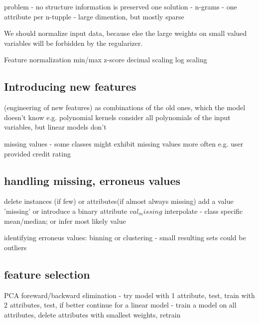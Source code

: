 \documentclass{article}
\begin{document}

problem - no structure information is preserved
          one solution - n-grams
              - one attribute per n-tupple
              - large dimention, but mostly sparse

We should normalize input data, because else the large weights on small valued variables will be forbidden by the regularizer.

Feature normalization
    min/max
    z-score
    decimal scaling
    log scaling

\subsection{Introducing new features}(engineering of new features) as combinations of the old ones, which the model doesn't know
e.g. polynomial kernels consider all polynomials of the input variables, but linear models don't

missing values - some classes might exhibit missing values more often e.g. user provided credit rating

\subsection{handling missing, erroneus values}
    delete instances (if few) or attributes(if almost always missing)
    add a value 'missing'
    or introduce a binary attribute $val_missing$
    interpolate - class specific mean/median; or infer most likely value

identifying erroneus values:
    binning or clustering - small resulting sets could be outliers

\subsection{feature selection}
    PCA
    foreward/backward elimination - try model with 1 attribute, test, train with 2 attributes, test, if better continue
    for a linear model - train a model on all attributes, delete attributes with smallest weights, retrain
\end{document}
